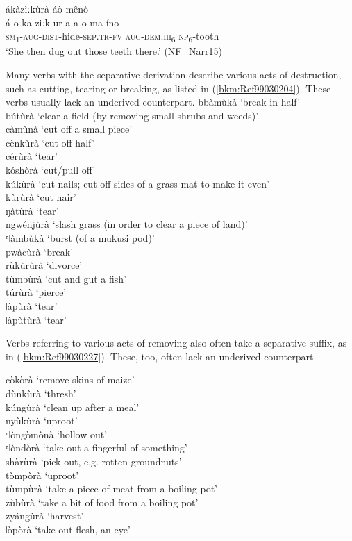 \ea
\label{bkm:Ref445725028}
ákàzìːkùrà áò mênò\\
\gll á-o-ka-ziːk-ur-a      a-o    ma-íno\\
\textsc{sm}\textsubscript{1}-\textsc{aug}-\textsc{dist}-hide-\textsc{sep}.\textsc{tr}-\textsc{fv}  \textsc{aug}-\textsc{dem}.\textsc{iii}\textsubscript{6}  \textsc{np}\textsubscript{6}-tooth\\
\glt ‘She then dug out those teeth there.’ (NF\_Narr15)
\z

Many verbs with the separative derivation describe various acts of destruction, such as cutting, tearing or breaking, as listed in (\ref{bkm:Ref99030204}). These verbs usually lack an underived counterpart.
\ea
\label{bkm:Ref99030204}
bbàmùkà \tab ‘break in half’\\
bútùrà \tab ‘clear a field (by removing small shrubs and weeds)’\\
càmùnà \tab ‘cut off a small piece’\\
cènkùrà \tab ‘cut off half’\\
cérùrà \tab ‘tear’\\
kóshòrà \tab ‘cut/pull off’\\
kúkùrà \tab ‘cut nails; cut off sides of a grass mat to make it even’\\
kùrùrà \tab ‘cut hair’\\
ŋàtùrà \tab ‘tear’\\
ngwénjùrà \tab ‘slash grass (in order to clear a piece of land)’\\
ⁿǀàmbùkà \tab ‘burst (of a mukusi pod)’\\
pwàcùrà \tab ‘break’\\
rùkùrùrà \tab ‘divorce’\\
tùmbùrà \tab ‘cut and gut a fish’\\
túrùrà \tab ‘pierce’\\
ǀàpùrà \tab ‘tear’\\
ǀàpùtùrà \tab ‘tear’\\
\z

Verbs referring to various acts of removing also often take a separative suffix, as in (\ref{bkm:Ref99030227}). These, too, often lack an underived counterpart.

\ea
\label{bkm:Ref99030227}
còkòrà \tab ‘remove skins of maize’\\
dùnkùrà \tab ‘thresh’\\
kúngùrà \tab ‘clean up after a meal’\\
nyùkùrà \tab ‘uproot’\\
ⁿǀòngòmònà \tab ‘hollow out’\\
ⁿǀòndòrà \tab ‘take out a fingerful of something’\\
shàrùrà \tab ‘pick out, e.g. rotten groundnuts’\\
tòmpòrà \tab ‘uproot’\\
tùmpùrà \tab ‘take a piece of meat from a boiling pot’\\
zùbùrà \tab ‘take a bit of food from a boiling pot’\\
zyángùrà \tab ‘harvest’\\
ǀòpòrà \tab ‘take out flesh, an eye’\\
\z

